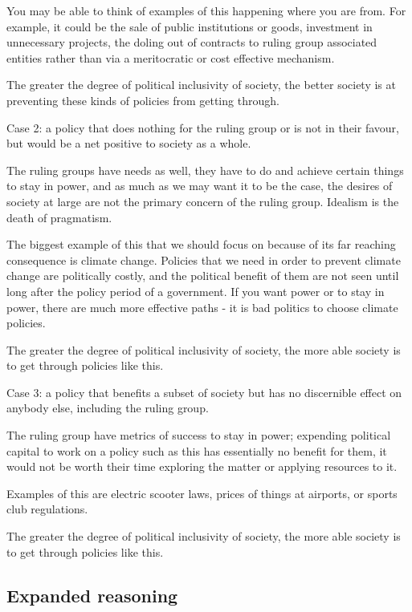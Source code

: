 \documentclass[twoside]{article}
\theoremstyle{definition}
\begin{document}
You may be able to think of examples of this happening where you are from. For example, it could be the sale of public institutions or goods, investment in unnecessary projects, the doling out of contracts to ruling group associated entities rather than via a meritocratic or cost effective mechanism.

The greater the degree of political inclusivity of society, the better society is at preventing these kinds of policies from getting through.

Case 2: a policy that does nothing for the ruling group or is not in their favour, but would be a net positive to society as a whole.

The ruling groups have needs as well, they have to do and achieve certain things to stay in power, and as much as we may want it to be the case, the desires of society at large are not the primary concern of the ruling group. Idealism is the death of pragmatism.

The biggest example of this that we should focus on because of its far reaching consequence is climate change. Policies that we need in order to prevent climate change are politically costly, and the political benefit of them are not seen until long after the policy period of a government. If you want power or to stay in power, there are much more effective paths - it is bad politics to choose climate policies.

The greater the degree of political inclusivity of society, the more able society is to get through policies like this.

Case 3: a policy that benefits a subset of society but has no discernible effect on anybody else, including the ruling group.

The ruling group have metrics of success to stay in power; expending political capital to work on a policy such as this has essentially no benefit for them, it would not be worth their time exploring the matter or applying resources to it.

Examples of this are electric scooter laws, prices of things at airports, or sports club regulations.

The greater the degree of political inclusivity of society, the more able society is to get through policies like this.

\subsection{Expanded reasoning}
\end{document}
